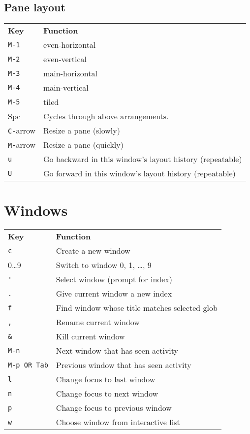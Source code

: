 \documentclass[landscape]{article}
\newcommand{\thead}[1]{{\color{black}\bf#1}}
\newcommand{\blankfirst}{%
  \ifodd\rownum\advance\rownum1\relax\fi}
\begin{document}
\begin{multicols}{3}
  \subsection*{\color{gray!80}Pane layout}
  \blankfirst
  \noindent\begin{tabular}{p{0.6in}p{2.3in}} %
    \thead{Key} & \thead{Function}\\
    \verb|M-1| & even-horizontal\\
    \verb|M-2| & even-vertical\\
    \verb|M-3| & main-horizontal\\
    \verb|M-4| & main-vertical\\
    \verb|M-5| & tiled\\
    Spc & Cycles through above arrangements.\\
    \verb|C-|arrow & Resize a pane (slowly)\\
    \verb|M-|arrow & Resize a pane (quickly)\\
    \verb|u| & Go backward in this window's layout history (repeatable)\\
    \verb|U| & Go forward in this window's layout history (repeatable)\\
  \end{tabular}   
  \columnbreak

  \section*{Windows}
  \blankfirst
  \noindent\begin{tabular}{p{0.6in}p{2.3in}} %
    \thead{Key} & \thead{Function}\\
    \verb|c| & Create a new window\\
    0\dots9 & Switch to window 0, 1, \dots, 9\\
    \verb|'| & Select window (prompt for index)\\
    \verb|.| & Give current window a new index\\
    \verb|f| & Find window whose title matches selected glob\\
    \verb|,| & Rename current window\\
    \verb|&| & Kill current window\\
    \verb|M-n| & Next window that has seen activity\\
    \verb|M-p OR Tab| & Previous window that has seen activity\\
    \verb|l| & Change focus to last window\\
    \verb|n| & Change focus to next window\\
    \verb|p| & Change focus to previous window\\
    \verb|w| & Choose window from interactive list\\
  \end{tabular}

\end{multicols}
\end{document}
